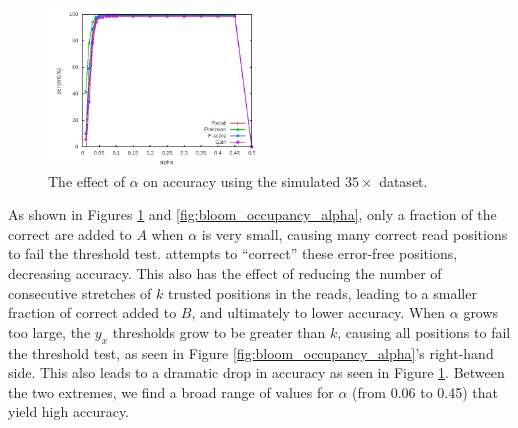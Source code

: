 \documentclass[10pt]{article}
\begin{document}

\begin{figure}[h!]
\begin{center}
\includegraphics[width=0.5\textwidth]{alpha.jpg}
\caption{The effect of $\alpha$ on accuracy using the simulated $35\times$ dataset.\label{fig:alpha}}
\end{center}
\end{figure}

As shown in Figures \ref{fig:alpha} and \ref{fig:bloom_occupancy_alpha}, only a fraction of the correct \kmers are added to $A$ when $\alpha$ is very small, causing many correct read positions to fail the threshold test.  \tool attempts to ``correct'' these error-free positions, decreasing accuracy.  This also has the effect of reducing the number of consecutive stretches of $k$ trusted positions in the reads, leading to a smaller fraction of correct \kmers added to $B$, and ultimately to lower accuracy.  When $\alpha$ grows too large, the $y_x$ thresholds grow to be greater than $k$, causing all positions to fail the threshold test, as seen in Figure \ref{fig:bloom_occupancy_alpha}'s right-hand side.  This also leads to a dramatic drop in accuracy as seen in Figure \ref{fig:alpha}.  Between the two extremes, we find a broad range of values for $\alpha$ (from 0.06 to 0.45) that yield high accuracy.

\end{document}
